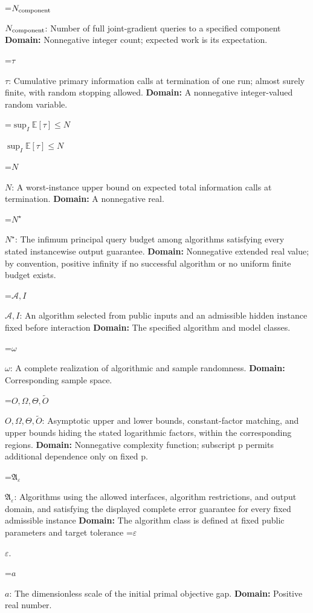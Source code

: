 \documentclass[10pt,a4paper]{article}
\newcommand{\AtlasMath}[1]{\par\begingroup\centering\setbox0=\hbox{$\displaystyle #1$}\ifdim\wd0>1.4\linewidth\typeout{ATLAS WIDE FORMULA: \the\wd0}\fi\ifdim\wd0>\linewidth\resizebox{\linewidth}{!}{\box0}\else\box0\fi\par\endgroup}
\newcommand{\AtlasInlineMath}[1]{\begingroup\setbox0=\hbox{$#1$}\ifdim\wd0>.4\linewidth\endgroup\AtlasMath{#1}\else\endgroup$#1$\fi}
\begin{document}
\AtlasInlineMath{N_{\rm component}}: Number of full joint-gradient queries to a specified component \textbf{Domain:} Nonnegative integer count; expected work is its expectation.



\AtlasInlineMath{\tau}: Cumulative primary information calls at termination of one run; almost surely finite, with random stopping allowed. \textbf{Domain:} A nonnegative integer-valued random variable.



\AtlasInlineMath{\sup_I\mathbb E[\tau]\le N}



\AtlasInlineMath{N}: A worst-instance upper bound on expected total information calls at termination. \textbf{Domain:} A nonnegative real.



\AtlasInlineMath{N^\star}: The infimum principal query budget among algorithms satisfying every stated instancewise output guarantee. \textbf{Domain:} Nonnegative extended real value; by convention, positive infinity if no successful algorithm or no uniform finite budget exists.



\AtlasInlineMath{\mathcal A,I}: An algorithm selected from public inputs and an admissible hidden instance fixed before interaction \textbf{Domain:} The specified algorithm and model classes.



\AtlasInlineMath{\omega}: A complete realization of algorithmic and sample randomness. \textbf{Domain:} Corresponding sample space.



\AtlasInlineMath{O,\Omega,\Theta,\widetilde O}: Asymptotic upper and lower bounds, constant-factor matching, and upper bounds hiding the stated logarithmic factors, within the corresponding regions. \textbf{Domain:} Nonnegative complexity function; subscript p permits additional dependence only on fixed p.



\AtlasInlineMath{\mathfrak A_\varepsilon}: Algorithms using the allowed interfaces, algorithm restrictions, and output domain, and satisfying the displayed complete error guarantee for every fixed admissible instance \textbf{Domain:} The algorithm class is defined at fixed public parameters and target tolerance \AtlasInlineMath{\varepsilon}.



\AtlasInlineMath{a}: The dimensionless scale of the initial primal objective gap. \textbf{Domain:} Positive real number.
\end{document}
